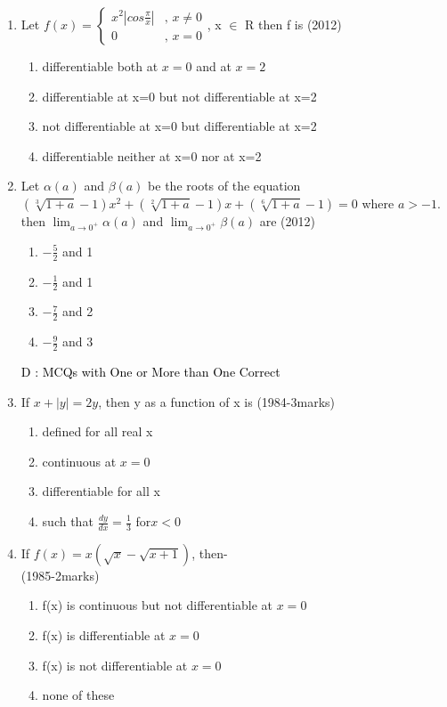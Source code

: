 \documentclass[journal,12pt,twocolumn]{IEEEtran}
\theoremstyle{remark}
\begin{document}
\begin{enumerate}
\item 
Let $f(x) =\begin{cases} x^2|cos \frac{\pi}{x}| & \text{, } x \neq 0 \\ 0 & \text{, } x = 0 
\end{cases}
$, x $\in$ R then f is
\hfill{(2012)} \\
\begin{enumerate}[label=\alph*)]
    \item differentiable both at $x=0$ and at $x=2$
    \item differentiable at x=0 but not differentiable at x=2
    \item not differentiable at x=0 but differentiable at x=2
    \item differentiable neither at x=0 nor at x=2
\end{enumerate}

\item 
Let $\alpha(a)$ and $\beta(a)$ be the roots of the equation $(\sqrt[3]{1+a}-1)x^2+(\sqrt[2]{1+a}-1)x+(\sqrt[6]{1+a}-1)=0$ where $a>-1$. then $\lim_{a \to 0^+}{\alpha(a)}$ and $\lim_{a \to 0^+}{\beta(a)}$ are
\hfill{(2012)} \\

\begin{enumerate}[label=\alph*)]
    \item $-\frac{5}{2}$ and 1
    \item $-\frac{1}{2}$ and 1
    \item $-\frac{7}{2}$ and 2
    \item $-\frac{9}{2}$ and 3
\end{enumerate}


\fontsize{14}{16}\selectfont
\textcolor{black}{D : MCQs with One or More than One Correct \\ }

\item If $x+|y|=2y$, then y as a function of x is
\hfill{(1984-3marks)} \\
\begin{enumerate}[label=\alph*)]
    \item defined for all real x
    \item continuous at $x=0$
    \item differentiable for all x
    \item such that $\frac{dy}{dx}=\frac{1}{3}$ for$x<0$
\end{enumerate}

\item If $f(x)=x(\sqrt{x}-\sqrt{x+1})$, then- \\
\hfill{(1985-2marks)} \\
\begin{enumerate}[label=\alph*)]
    \item f(x) is continuous but not differentiable at $x=0$
    \item f(x) is differentiable at $x=0$
    \item f(x) is not differentiable at $x=0$
    \item none of these
\end{enumerate}


\end{enumerate}
\end{document}
